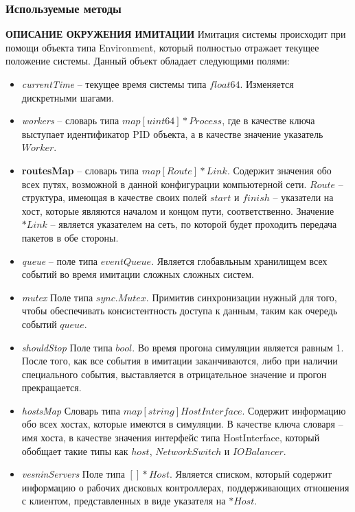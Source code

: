 \subsubsection{Используемые методы}
\textbf{ОПИСАНИЕ ОКРУЖЕНИЯ ИМИТАЦИИ}
Имитация системы происходит при помощи объекта типа Environment, который полностью отражает текущее положение системы. Данный объект обладает следующими полями:
\begin{itemize}
\item \textit{currentTime} -- текущее время системы типа $float64$. Изменяется дискретными шагами.

\item \textit{workers} -- словарь типа $map[uint64]*Process$, где в качестве ключа выступает идентификатор PID объекта, а в качестве значение указатель $Worker$.

\item \textbf{routesMap} -- словарь типа  $map[Route]*Link$. Содержит значения обо всех путях, возможной в данной конфигурации компьютерной сети. $Route$ -- структура, имеющая в качестве своих полей $start$ и $finish$ -- указатели на хост, которые являются началом и концом пути, соответственно. Значение $*Link$ -- является указателем на сеть, по которой будет проходить передача пакетов в обе стороны.


\item \textit{queue} -- поле типа $eventQueue$. Является глобавльным хранилищем всех событий во время имитации сложных сложных систем.

\item \textit{mutex}         
Поле типа $sync.Mutex$. Примитив синхронизации нужный для того, чтобы обеспечивать консистентность доступа к данным, таким как очередь событий $queue$. 

\item \textit{shouldStop}    
Поле типа $bool$. Во время прогона симуляции является равным 1. После того, как все события в имитации заканчиваются, либо при наличии специального события, выставляется в отрицательное значение и прогон прекращается.

\item \textit{hostsMap}      
Словарь типа $map[string]HostInterface$. Содержит информацию обо всех хостах, которые имеются в симуляции. В качестве ключа словаря -- имя хоста, в качестве значения интерфейс типа HostInterface, который обобщает такие типы как $host$, $NetworkSwitch$ и $IOBalancer$.

\item \textit{vesninServers}
Поле типа $[]*Host$. Является списком, который содержит информацию о рабочих дисковых контроллерах, поддерживающих отношения с клиентом, представленных в виде указателя на $*Host$.


\end{itemize}
